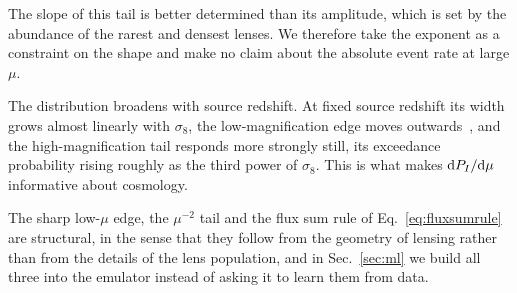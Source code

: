 \documentclass[aps,prd,10pt,nofootinbib,twocolumn,superscriptaddress,floatfix,notitlepage]{revtex4-1}
\newcommand{\td}{{\rm d}}
\newcommand{\B}[1]{{\color{blue} #1}}
\begin{document}
\B{The slope of this tail is better determined than its amplitude, which is set by the abundance of the rarest and densest lenses. We therefore take the exponent as a constraint on the shape and make no claim about the absolute event rate at large $\mu$.}

The distribution broadens with source redshift. At fixed source redshift its width grows almost linearly with $\sigma_8$, the low-magnification edge moves outwards~\cite{Premadi:2001ez}, and the high-magnification tail responds more strongly still, its exceedance probability rising roughly as the third power of $\sigma_8$. This is what makes $\td P_I/\td\mu$ informative about cosmology.

The sharp low-$\mu$ edge, the $\mu^{-2}$ tail and the flux sum rule of Eq.~\eqref{eq:fluxsumrule} are structural, in the sense that they follow from the geometry of lensing rather than from the details of the lens population, and in Sec.~\ref{sec:ml} we build all three into the emulator instead of asking it to learn them from data.
\end{document}
